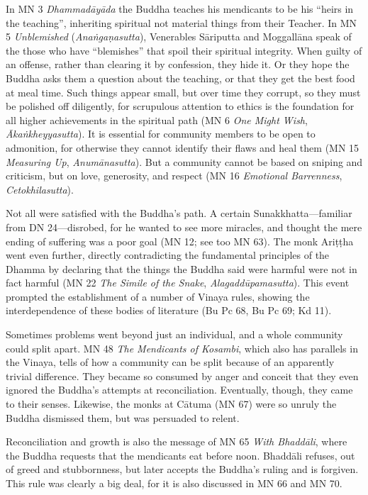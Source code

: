 \documentclass[12pt,openany]{book}%
\begin{document}
In MN 3 \textit{\textsanskrit{Dhammadāyāda}} the Buddha teaches his mendicants to be his “heirs in the teaching”, inheriting spiritual not material things from their Teacher. In MN 5 \textit{Unblemished} (\textit{\textsanskrit{Anaṅgaṇasutta}}), Venerables \textsanskrit{Sāriputta} and \textsanskrit{Moggallāna} speak of the those who have “blemishes” that spoil their spiritual integrity. When guilty of an offense, rather than clearing it by confession, they hide it. Or they hope the Buddha asks them a question about the teaching, or that they get the best food at meal time. Such things appear small, but over time they corrupt, so they must be polished off diligently, for scrupulous attention to ethics is the foundation for all higher achievements in the spiritual path (MN 6 \textit{One Might Wish}, \textit{\textsanskrit{Ākaṅkheyyasutta}}). It is essential for community members to be open to admonition, for otherwise they cannot identify their flaws and heal them (MN 15 \textit{Measuring Up}, \textit{\textsanskrit{Anumānasutta}}). But a community cannot be based on sniping and criticism, but on love, generosity, and respect (MN 16 \textit{Emotional Barrenness}, \textit{Cetokhilasutta}).

Not all were satisfied with the Buddha’s path. A certain Sunakkhatta—familiar from DN 24—disrobed, for he wanted to see more miracles, and thought the mere ending of suffering was a poor goal (MN 12; see too MN 63). The monk \textsanskrit{Ariṭṭha} went even further, directly contradicting the fundamental principles of the Dhamma by declaring that the things the Buddha said were harmful were not in fact harmful (MN 22 \textit{The Simile of the Snake}, \textit{\textsanskrit{Alagaddūpamasutta}}). This event prompted the establishment of a number of Vinaya rules, showing the interdependence of these bodies of literature (Bu Pc 68, Bu Pc 69; Kd 11).

Sometimes problems went beyond just an individual, and a whole community could split apart. MN 48 \textit{The Mendicants of Kosambi}, which also has parallels in the Vinaya, tells of how a community can be split because of an apparently trivial difference. They became so consumed by anger and conceit that they even ignored the Buddha’s attempts at reconciliation. Eventually, though, they came to their senses. Likewise, the monks at \textsanskrit{Cātuma} (MN 67) were so unruly the Buddha dismissed them, but was persuaded to relent.

Reconciliation and growth is also the message of MN 65 \textit{With \textsanskrit{Bhaddāli}}, where the Buddha requests that the mendicants eat before noon. \textsanskrit{Bhaddāli} refuses, out of greed and stubbornness, but later accepts the Buddha’s ruling and is forgiven. This rule was clearly a big deal, for it is also discussed in MN 66 and MN 70.
\end{document}
